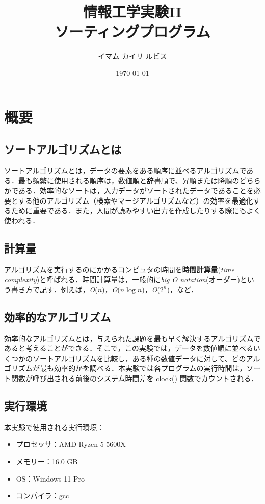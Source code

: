 \documentclass[a4j, titlepage]{jarticle}
\title{情報工学実験II\\ソーティングプログラム}
\author{イマム カイリ ルビス}
\date{\today}
\begin{document}
    \maketitle

    \tableofcontents
    \clearpage

    \section{概要}
        \subsection{ソートアルゴリズムとは}
            ソートアルゴリズムとは，データの要素をある順序に並べるアルゴリズムである．最も頻繁に使用される順序は，数値順と辞書順で、昇順または降順のどちらかである．効率的なソートは，入力データがソートされたデータであることを必要とする他のアルゴリズム（検索やマージアルゴリズムなど）の効率を最適化するために重要である．また，人間が読みやすい出力を作成したりする際にもよく使われる\cite{cite:wiki}．
            
        
        \subsection{計算量}
            アルゴリズムを実行するのにかかるコンピュタの時間を\textbf{時間計算量}(\textit{time complexity})と呼ばれる．時間計算量は，一般的に\textit{big O notation}(オーダー)という書き方で記す．例えば，\textit{O}($n$)，\textit{O}($n \log n$)，\textit{O}($2^n$)，など．

        \subsection{効率的なアルゴリズム}
            効率的なアルゴリズムとは，与えられた課題を最も早く解決するアルゴリズムであると考えることができる．そこで，この実験では，データを数値順に並べるいくつかのソートアルゴリズムを比較し，ある種の数値データに対して、どのアルゴリズムが最も効率的かを調べる．本実験では各プログラムの実行時間は，ソート関数が呼び出される前後のシステム時間差を clock() 関数でカウントされる．

        \subsection{実行環境}
            本実験で使用される実行環境：
            \begin{screen}
                \begin{itemize}
                    \item プロセッサ：AMD Ryzen 5 5600X
                    \item メモリー：16.0 GB
                    \item OS：Windows 11 Pro
                    \item コンパイラ：gcc
                \end{itemize}    
            \end{screen}
        
\end{document}
